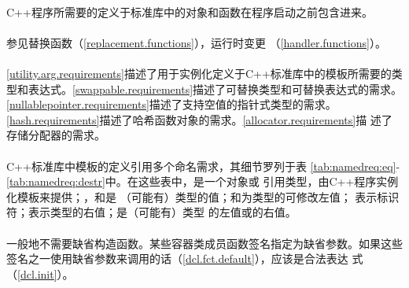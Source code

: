 \paragraph{}
C++程序所需要的定义于标准库中的对象和函数在程序启动之前包含进来。

\paragraph{}
参见替换函数（\ref{replacement.functions}），运行时变更
（\ref{handler.functions}）。

\paragraph{}
\ref{utility.arg.requirements}描述了用于实例化定义于C++标准库中的模板所需要的类
型和表达式。\ref{swappable.requirements}描述了可替换类型和可替换表达式的需求。
\ref{nullablepointer.requirements}描述了支持空值的指针式类型的需求。
\ref{hash.requirements}描述了哈希函数对象的需求。\ref{allocator.requirements}描
述了存储分配器的需求。

\paragraph{}
C++标准库中模板的定义引用多个命名需求，其细节罗列于表
\ref{tab:namedreq:eq}-\ref{tab:namedreq:destr}中。在这些表中，是一个对象或
引用类型，由C++程序实例化模板来提供；，和是
（可能有）类型的值；和为类型的可修改左值；
表示标识符；表示类型的右值；是（可能有）类型
的左值或的右值。

\paragraph{}
一般地不需要缺省构造函数。某些容器类成员函数签名指定为缺省参数。如果这些
签名之一使用缺省参数来调用的话（\ref{dcl.fct.default}），应该是合法表达
式（\ref{dcl.init}）。

